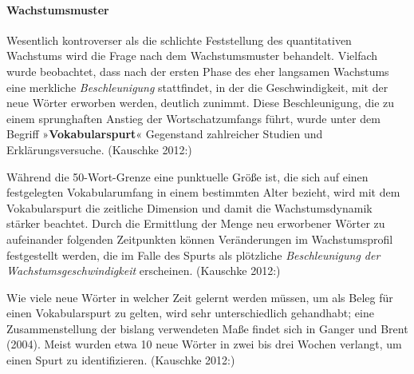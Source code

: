 \documentclass[
  letterpaper,
]{scrbook}
\let\oldparagraph\paragraph
\renewcommand{\paragraph}[1]{\oldparagraph{#1}\mbox{}}
\begin{document}
\hypertarget{wachstumsmuster}{%
\paragraph{Wachstumsmuster}\label{wachstumsmuster}}

Wesentlich kontroverser als die schlichte Feststellung des quantitativen
Wachstums wird die Frage nach dem Wachstumsmuster behandelt. Vielfach
wurde beobachtet, dass nach der ersten Phase des eher langsamen
Wachstums eine merkliche \emph{Beschleunigung} stattfindet, in der die
Geschwindigkeit, mit der neue Wörter erworben werden, deutlich zunimmt.
Diese Beschleunigung, die zu einem sprunghaften Anstieg der
Wortschatzumfangs führt, wurde unter dem Begriff
»\textbf{Vokabularspurt}« Gegenstand zahlreicher Studien und
Erklärungsversuche. (Kauschke 2012:)

Während die 50-Wort-Grenze eine punktuelle Größe ist, die sich auf einen
festgelegten Vokabularumfang in einem bestimmten Alter bezieht, wird mit
dem Vokabularspurt die zeitliche Dimension und damit die
Wachstumsdynamik stärker beachtet. Durch die Ermittlung der Menge neu
erworbener Wörter zu aufeinander folgenden Zeitpunkten können
Veränderungen im Wachstumsprofil festgestellt werden, die im Falle des
Spurts als plötzliche \emph{Beschleunigung der Wachstumsgeschwindigkeit}
erscheinen. (Kauschke 2012:)

Wie viele neue Wörter in welcher Zeit gelernt werden müssen, um als
Beleg für einen Vokabularspurt zu gelten, wird sehr unterschiedlich
gehandhabt; eine Zusammenstellung der bislang verwendeten Maße findet
sich in Ganger und Brent (2004). Meist wurden etwa 10 neue Wörter in
zwei bis drei Wochen verlangt, um einen Spurt zu identifizieren.
(Kauschke 2012:)
\end{document}
